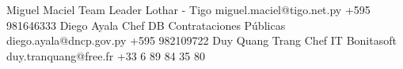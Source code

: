 %
%
%

\begin{referees}
		{Miguel Maciel}
		{Team Leader}
		{Lothar - Tigo}
		{miguel.maciel@tigo.net.py}
		{+595 981646333}
		{Diego Ayala}
		{Chef DB}
		{Contrataciones Públicas}
		{diego.ayala@dncp.gov.py}
		{+595 982109722}
		{Duy Quang Trang}
		{Chef IT}
		{Bonitasoft}
		{duy.tranquang@free.fr}
		{+33 6 89 84 35 80‬}
\end{referees}